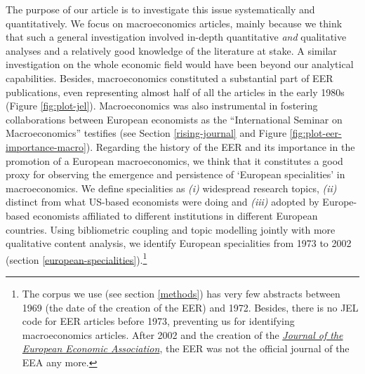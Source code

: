 \documentclass[]{elsarticle} %
\begin{document}
The purpose of our article is to investigate this issue systematically
and quantitatively. We focus on macroeconomics articles, mainly because
we think that such a general investigation involved in-depth
quantitative \emph{and} qualitative analyses and a relatively good
knowledge of the literature at stake. A similar investigation on the
whole economic field would have been beyond our analytical capabilities.
Besides, macroeconomics constituted a substantial part of EER
publications, even representing almost half of all the articles in the
early 1980s (Figure \ref{fig:plot-jel}). Macroeconomics was also
instrumental in fostering collaborations between European economists as
the ``International Seminar on Macroeconomics'' testifies (see Section
\ref{rising-journal} and Figure \ref{fig:plot-eer-importance-macro}).
Regarding the history of the EER and its importance in the promotion of
a European macroeconomics, we think that it constitutes a good proxy for
observing the emergence and persistence of `European specialities' in
macroeconomics. We define specialities as \emph{(i)} widespread research
topics, \emph{(ii)} distinct from what US-based economists were doing
and \emph{(iii)} adopted by Europe-based economists affiliated to
different institutions in different European countries. Using
bibliometric coupling and topic modelling jointly with more qualitative
content analysis, we identify European specialities from 1973 to 2002
(section \ref{european-specialities}).\footnote{The corpus we use (see
  section \ref{methods}) has very few abstracts between 1969 (the date
  of the creation of the EER) and 1972. Besides, there is no JEL code
  for EER articles before 1973, preventing us for identifying
  macroeconomics articles. After 2002 and the creation of the
  \href{https://academic.oup.com/jeea}{\emph{Journal of the European
  Economic Association}}, the EER was not the official journal of the
  EEA any more.}
\end{document}
